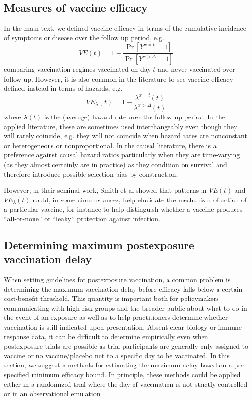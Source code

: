 \begin{appendix}
    \subsection{Measures of vaccine efficacy}
    In the main text, we defined vaccine efficacy in terms of the cumulative incidence of symptoms or disease over the follow up period, e.g.
    $$
    VE(t) = 1 - \frac{\Pr[Y^{x=t} = 1]}{\Pr[Y^{x > \Delta} = 1]}
    $$ 
    comparing vaccination regimes vaccinated on day $t$ and never vaccinated over follow up. However, it is also common in the literature to see vaccine efficacy defined instead in terms of hazards, e.g.
    $$
    VE_\lambda(t) = 1 - \frac{\lambda^{x=t}(t)}{\lambda^{x > \Delta}(t)}
    $$ 
    where $\lambda(t)$ is the (average) hazard rate over the follow up period. In the applied literature, these are sometimes used interchangeably even though they will rarely coincide, e.g. they will not coincide when hazard rates are nonconstant or heterogeneous or nonproportional. In the causal literature, there is a preference against causal hazard ratios particularly when they are time-varying (as they almost certainly are in practice) as they condition on survival and therefore introduce possible selection bias by construction. 

    However, in their seminal work, Smith et al showed that patterns in $VE(t)$ and $VE_\lambda(t)$ could, in some circumstances, help elucidate the mechanism of action of a particular vaccine, for instance to help distinguish whether a vaccine produces ``all-or-none'' or ``leaky'' protection against infection. 

    \subsection{Determining maximum postexposure vaccination delay} \label{sec:maxdelay}
    When setting guidelines for postexposure vaccination, a common problem is determining the maximum vaccination delay before efficacy falls below a certain cost-benefit threshold. This quantity is important both for policymakers communicating with high risk groups and the broader public about what to do in the event of an exposure as well as to help practitioners determine whether vaccination is still indicated upon presentation. Absent clear biology or immune response data, it can be difficult to determine empirically even when postexposure trials are possible as trial participants are generally only assigned to vaccine or no vaccine/placebo not to a specific day to be vaccinated. In this section, we suggest a methods for estimating the maximum delay based on a pre-specified minimum efficacy bound. In principle, these methods could be applied either in a randomized trial where the day of vaccination is not strictly controlled or in an observational emulation. 
 

\end{appendix}
